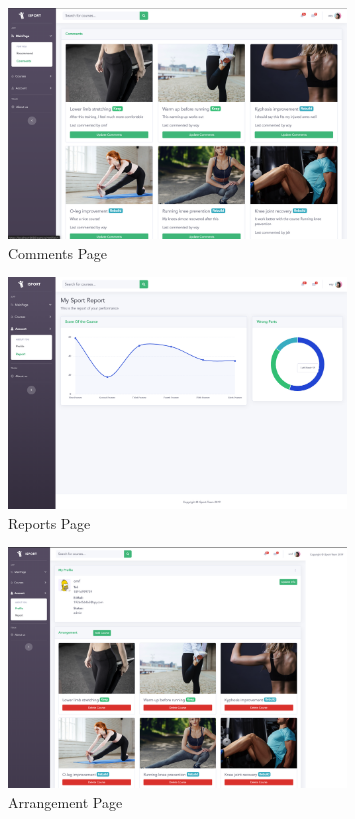 \documentclass[16pt]{scrreprt}
\begin{document}
\begin{figure}[H]
    \centering
    \includegraphics[width=0.8\textwidth]{diagrams/comment.png}
    \caption{Comments Page}
\end{figure}

\begin{figure}[H]
    \centering
    \includegraphics[width=0.8\textwidth]{diagrams/report.png}
    \caption{Reports Page}
\end{figure}

\begin{figure}[H]
    \centering
    \includegraphics[width=0.8\textwidth]{diagrams/arrange.png}
    \caption{Arrangement Page}
\end{figure}
\end{document}
